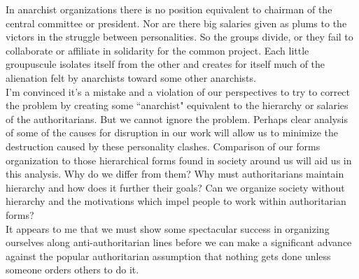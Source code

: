 In anarchist organizations there is no position equivalent to chairman of the central committee or president. Nor are there big salaries given as plums to the victors in the struggle between personalities. So the groups divide, or they fail to collaborate or affiliate in solidarity for the common project. Each little groupuscule isolates itself from the other and creates for itself much of the alienation felt by anarchists toward some other anarchists.\\
I'm convinced it's a mistake and a violation of our perspectives to try to correct the problem by creating some ``anarchist" equivalent to the hierarchy or salaries of the authoritarians. But we cannot ignore the problem. Perhaps clear analysis of some of the causes for disruption in our work will allow us to minimize the destruction caused by these personality clashes. Comparison of our forms organization to those hierarchical forms found in society around us will aid us in this analysis. Why do we differ from them? Why must authoritarians maintain hierarchy and how does it further their goals? Can we organize society without hierarchy and the motivations which impel people to work within authoritarian forms?\\
It appears to me that we must show some spectacular success in organizing ourselves along anti-authoritarian lines before we can make a significant advance against the popular authoritarian assumption that nothing gets done unless someone orders others to do it.
